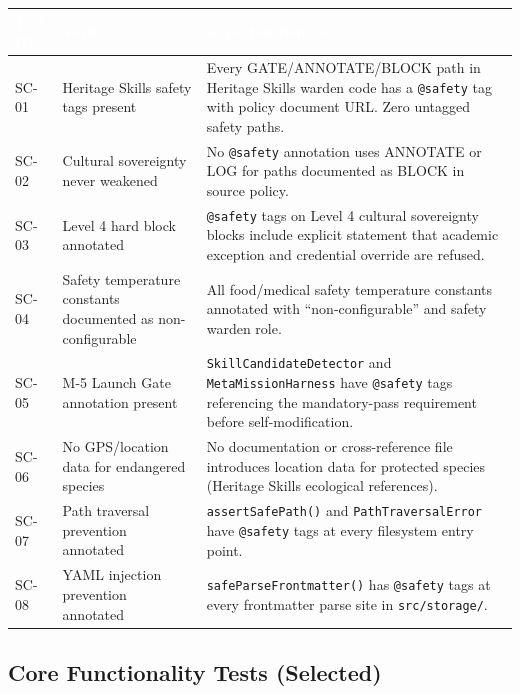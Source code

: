 \documentclass[11pt,letterpaper]{article}
\newcommand{\tableheader}[1]{\textbf{\sffamily\textcolor{white}{#1}}}
\begin{document}
\begin{center}
\begin{tabularx}{\textwidth}{C{1.5cm}L{4.5cm}X}
\toprule
{}
\tableheader{Test ID} & \tableheader{Verifies} & \tableheader{Expected Behavior} \\
\midrule
SC-01 & Heritage Skills safety tags present & Every GATE/ANNOTATE/BLOCK path in Heritage Skills warden code has a \texttt{@safety} tag with policy document URL. Zero untagged safety paths. \\
SC-02 & Cultural sovereignty never weakened & No \texttt{@safety} annotation uses ANNOTATE or LOG for paths documented as BLOCK in source policy. \\
SC-03 & Level 4 hard block annotated & \texttt{@safety} tags on Level 4 cultural sovereignty blocks include explicit statement that academic exception and credential override are refused. \\
SC-04 & Safety temperature constants documented as non-configurable & All food/medical safety temperature constants annotated with ``non-configurable'' and safety warden role. \\
SC-05 & M-5 Launch Gate annotation present & \texttt{SkillCandidateDetector} and \texttt{MetaMissionHarness} have \texttt{@safety} tags referencing the mandatory-pass requirement before self-modification. \\
SC-06 & No GPS/location data for endangered species & No documentation or cross-reference file introduces location data for protected species (Heritage Skills ecological references). \\
SC-07 & Path traversal prevention annotated & \texttt{assertSafePath()} and \texttt{PathTraversalError} have \texttt{@safety} tags at every filesystem entry point. \\
SC-08 & YAML injection prevention annotated & \texttt{safeParseFrontmatter()} has \texttt{@safety} tags at every frontmatter parse site in \texttt{src/storage/}. \\
\bottomrule
\end{tabularx}
\end{center}

\subsection{Core Functionality Tests (Selected)}
\end{document}
